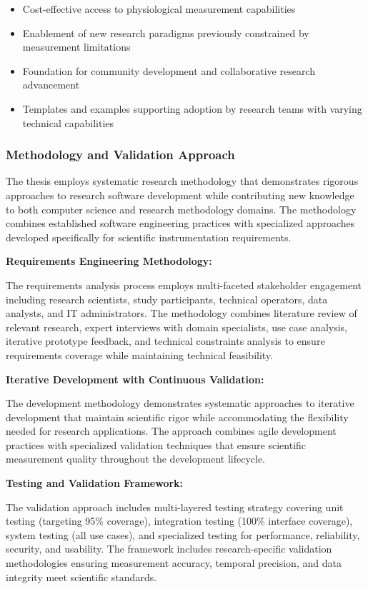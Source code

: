 \documentclass[11pt,a4paper]{article}
\begin{document}
\begin{itemize}
\item Cost-effective access to physiological measurement capabilities
\item Enablement of new research paradigms previously constrained by measurement limitations
\item Foundation for community development and collaborative research advancement
\item Templates and examples supporting adoption by research teams with varying technical capabilities

\end{itemize}
\subsubsection{Methodology and Validation Approach}

The thesis employs systematic research methodology that demonstrates rigorous
approaches to research software
development while contributing new knowledge to both computer science and research
methodology domains.  The methodology
combines established software engineering practices with specialized approaches
developed specifically for scientific
instrumentation requirements.

\textbf{Requirements Engineering Methodology:}

The requirements analysis process employs multi-faceted stakeholder engagement
including research scientists, study
participants, technical operators, data analysts, and IT administrators.  The
methodology combines literature review of
relevant research, expert interviews with domain specialists, use case
analysis, iterative prototype
feedback, and technical constraints analysis to ensure requirements coverage
while maintaining technical
feasibility.

\textbf{Iterative Development with Continuous Validation:}

The development methodology demonstrates systematic approaches to iterative
development that maintain scientific rigor
while accommodating the flexibility needed for research applications.  The approach
combines agile development practices
with specialized validation techniques that ensure scientific measurement quality
throughout the development lifecycle.

\textbf{Testing and Validation Framework:}

The validation approach includes multi-layered testing strategy covering unit testing
(targeting 95\% coverage),
integration testing (100\% interface coverage), system testing (all use cases), and
specialized testing for performance,
reliability, security, and usability.  The framework includes research-specific
validation methodologies ensuring
measurement accuracy, temporal precision, and data integrity meet scientific
standards.
\end{document}
